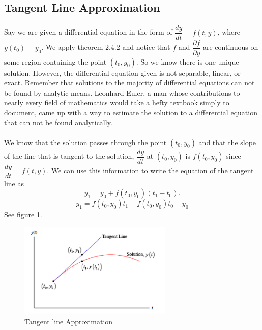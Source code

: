 \documentclass[font =22]{report}
\begin{document}
\subsection{Tangent Line Approximation}
\paragraph{}
Say we are given a differential equation  in the form of $\dfrac{dy}{dt}=f(t,y)$, where $y(t_0)=y_0$. We apply theorem 2.4.2 and notice that $f$ and $\dfrac{\partial f}{\partial y}$ are continuous on some region containing the point $(t_0,y_0)$. So we know there is one unique solution. However, the differential equation given is not separable, linear, or exact. Remember that solutions to the majority of differential equations can not be found by analytic means. Leonhard Euler, a man whose contributions to nearly every field of mathematics would take a hefty textbook simply to document, came up with a way to estimate the solution to a differential equation that can not be found analytically.

\paragraph{}
We know that the solution passes through the point $(t_0,y_0)$ and that the slope of the line that is tangent to the solution, $\dfrac{dy}{dt}$ at $(t_0,y_0)$ is $f(t_0,y_0)$ since $\dfrac{dy}{dt} = f(t,y)$. We can use this information to write the equation of the tangent line as
\[
y_1=y_0+f(t_0,y_0)(t_1-t_0).
\]
\[
y_1 = f(t_0,y_0)t_1 - f(t_0,y_0)t_0 + y_0
\]
See figure 1.



\begin{figure}[H]
  
  \centering
   \includegraphics[width=0.65\textwidth]{figures/tangent_line_approx.png}
   \caption{ Tangent line Approximation }
\end{figure}
\end{document}
